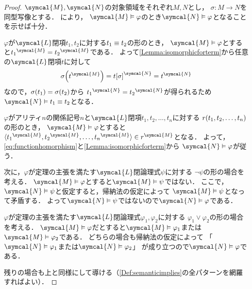\begin{proof}
	\(\symcal{M}, \symcal{N}\)の対象領域をそれぞれ\(M, N\)とし，
	\(\sigma \colon M \to N\)を同型写像とする．
	により，
	\(\symcal{M} \satisfy \varphi\)のとき\(\symcal{N} \satisfy \varphi\)となることを示せば十分．

	\(\varphi\)が\(\symcal{L}\)閉項\(t_1, t_2\)に対する\(t_1 \equiv t_2\)の形のとき，
	\(\symcal{M} \satisfy \varphi\)とすると\(\interpretation{\symcal{M}}{t_1} = \interpretation{\symcal{M}}{t_2}\)である．
	よって\cref{Lemma:isomorphicforterm}から任意の\(\symcal{L}\)閉項\(t\)に対して
	\[
		\apply{\sigma}{\interpretation{\symcal{M}}{t}}
		=
		\interpretation{\symcal{N}}{\subst{t}{\sigma}}
		=
		\interpretation{\symcal{N}}{t}
	\]
	なので，\(\apply{\sigma}{t_1} = \apply{\sigma}{t_2}\)から
	\(\interpretation{\symcal{N}}{t_1} = \interpretation{\symcal{N}}{t_2}\)が得られるため
	\(\symcal{N} \satisfy t_1 \objeq t_2\)となる．

	\(\varphi\)がアリティ\(n\)の関係記号\(n\)と\(\symcal{L}\)閉項\(t_1, t_2, \dots, t_n\)に対する
	\(\apply{r}{t_1, t_2, \dots, t_n}\)の形のとき，
	\(\symcal{M} \satisfy \varphi\)とすると
	\(\pair{
		\interpretation{\symcal{M}}{t_1},
		\interpretation{\symcal{M}}{t_2},
		\dots,
		\interpretation{\symcal{M}}{t_n}
	} \in \interpretation{\symcal{M}}{r}\)となる．
	よって，\cref{eq:functionhomorphism}と\cref{Lemma:isomorphicforterm}から
	\(\symcal{N} \satisfy \varphi\)が従う．

	次に，\(\varphi\)が定理の主張を満たす\(\symcal{L}\)閉論理式\(\psi\)に対する
	\(\lnot \psi\)の形の場合を考える．
	\(\symcal{M} \satisfy \varphi\)とすると\(\symcal{M} \satisfy \psi\)ではない．
	ここで，\(\symcal{N} \satisfy \psi\)と仮定すると，帰納法の仮定によって
	\(\symcal{M} \satisfy \psi\)となって矛盾する．
	よって\(\symcal{N} \satisfy \psi\)ではないので\(\symcal{N} \satisfy \varphi\)である．

	\(\varphi\)が定理の主張を満たす\(\symcal{L}\)閉論理式\(\varphi_1, \varphi_2\)に対する
	\(\varphi_1 \lor \varphi_2\)の形の場合を考える．
	\(\symcal{M} \satisfy \varphi\)だとすると\(\symcal{M} \satisfy \varphi_1\)または
	\(\symcal{M} \satisfy \varphi_2\)である．
	どちらの場合も帰納法の仮定によって
	「\(\symcal{N} \satisfy \varphi_1\)または\(\symcal{N} \satisfy \varphi_2\)」
	が成り立つので\(\symcal{N} \satisfy \varphi\)である．

	残りの場合も上と同様にして導ける（\cref{Def:semanticimplies}の全パターンを網羅すればよい）．
\end{proof}

